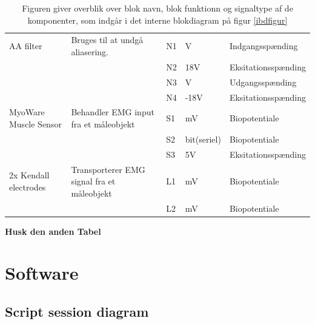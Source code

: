 \begin{table} [H]
  \centering

\begin{tabular}  {|p{3cm}|p{4cm}|p{1cm}|p{1.5cm}|p{3.8cm}| }

\hline

AA filter & Bruges til at undgå aliasering.  &  N1 & V & Indgangsspænding  \\ \cline{3-5}
	 &  & N2 & $  ${18V} & Eksitationsspænding \\ \cline{3-5} 
	 &  & N3 & V & Udgangsspænding \\ \cline{3-5} 
	 &  & N4 & $  ${-18V} & Eksitationsspænding \\ \cline{3-5} 
	 
	 \hline
	 

MyoWare Muscle Sensor & Behandler EMG input fra et måleobjekt 		 &  S1 & mV & Biopotentiale  \\ \cline{3-5}
	 &  & S2 & bit(seriel) & Biopotentiale \\ \cline{3-5} 
	 &  & S3 & 5V & Eksitationsspænding \\ \cline{3-5} \hline
	 
	 
2x Kendall electrodes & Transporterer EMG signal fra et måleobjekt  &  L1 & mV & Biopotentiale  \\ \cline{3-5}
	 &  & L2 & mV & Biopotentiale \\ \cline{3-5} \hline
	 

\end{tabular}
 \caption{Figuren giver overblik over blok navn, blok funktionn og signaltype af de komponenter, som indgår i det interne blokdiagram på figur \ref{ibdfigur}} \label{tab:Sigbeskriv.}
\end{table}

\textbf{Husk den anden Tabel}
\chapter{Software} \label{swafsnit}
\section{Script session diagram}

